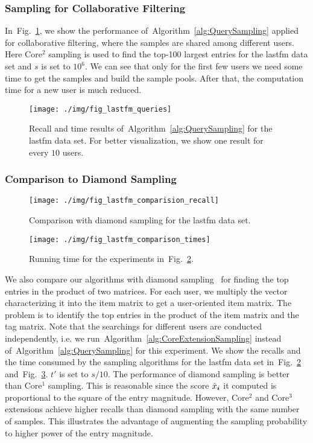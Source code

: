 \documentclass[10pt,journal,compsoc]{IEEEtran}
\newcommand{\V}[1]{{\boldsymbol{{\MakeLowercase{#1}}}}}
\newcommand{\Fig}[1]{Fig.~\ref{fig:#1}}
\newcommand{\Alg}[1]{Algorithm~\ref{alg:#1}}
\begin{document}
\subsubsection{Sampling for Collaborative Filtering}
In~\Fig{Queries}, we show the performance of~\Alg{QuerySampling}
applied for collaborative filtering,
where the samples are shared among different users.
Here Core$^2$ sampling is used to find the top-100 largest entries for the lastfm data set
and $s$ is set to $10^6$.
We can see that only for the first few users we need some time to get the samples
and build the sample pools.
After that, the computation time for a new user is much reduced.
\begin{figure}[!]
	\centering
	\texttt{[image: ./img/fig\_lastfm\_queries]}\\
	\caption{Recall and time results of~\Alg{QuerySampling} for the lastfm data set.
		For better visualization, we show one result for every $10$ users.}
	\label{fig:Queries}
\end{figure}
\subsubsection{Comparison to Diamond Sampling}
\begin{figure}[!ht]
	\centering
	\texttt{[image: ./img/fig\_lastfm\_comparision\_recall]}\\
	\caption{Comparison with diamond sampling for the lastfm data set.}
	\label{fig:Comparison_recall}
\end{figure}
\begin{figure}[!ht]
	\centering
	\texttt{[image: ./img/fig\_lastfm\_comparison\_times]}\\
	\caption{Running time for the experiments in~\Fig{Comparison_recall}.}
	\label{fig:Comparison_time}
\end{figure}
We also compare our algorithms with diamond sampling~\cite{BaPiKoSe15}
for finding the top entries in the product of two matrices.
For each user, we multiply the vector characterizing it into the item matrix
to get a user-oriented item matrix.
The problem is to identify the top entries in the product of the item matrix and the tag matrix.
Note that the searchings for different users are conducted independently,
i.e. we run~\Alg{CoreExtensionSampling} instead of~\Alg{QuerySampling} for this experiment.
We show the recalls and the time consumed by the sampling algorithms for the lastfm data set
in~\Fig{Comparison_recall} and~\Fig{Comparison_time}.
$t'$ is set to $s/10$.
The performance of diamond sampling is better than Core$^1$ sampling.
This is reasonable since the score $\hat{x}_{\V{i}}$ it computed is proportional to the square of the entry magnitude.
However, Core$^2$ and Core$^3$ extensions achieve higher recalls than diamond sampling with the same number of samples.
This illustrates the advantage of augmenting the sampling probability to higher power of the entry magnitude.
\end{document}
